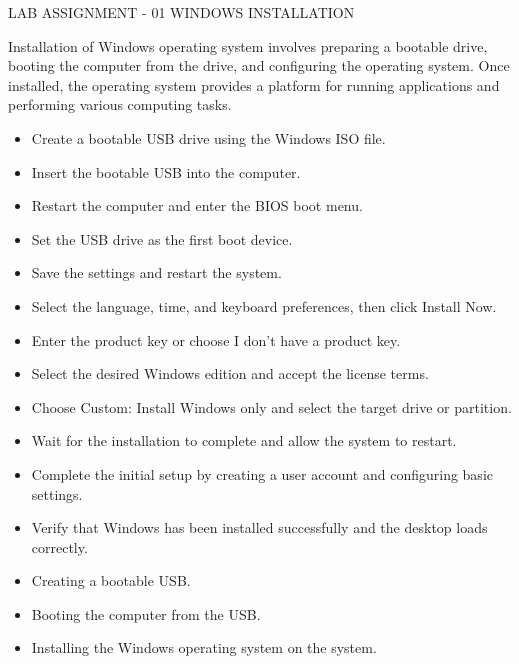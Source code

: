 
\assignmenttitle
    {LAB ASSIGNMENT - 01}
    {WINDOWS INSTALLATION}


Installation of Windows operating system involves preparing a bootable drive, booting the computer from the drive, and configuring the operating system. Once installed, the operating system provides a platform for running applications and performing various computing tasks.


\begin{itemize}
    \item Create a bootable USB drive using the Windows ISO file.
    \item Insert the bootable USB into the computer.
    \item Restart the computer and enter the BIOS boot menu.
    \item Set the USB drive as the first boot device.
    \item Save the settings and restart the system.
    \item Select the language, time, and keyboard preferences, then click Install Now.
    \item Enter the product key or choose I don't have a product key.
    \item Select the desired Windows edition and accept the license terms.
    \item Choose Custom: Install Windows only and select the target drive or partition.
    \item Wait for the installation to complete and allow the system to restart.
    \item Complete the initial setup by creating a user account and configuring basic settings.
    \item Verify that Windows has been installed successfully and the desktop loads correctly.
\end{itemize}

\begin{itemize}
\item{Creating a bootable USB.}
\item{Booting the computer from the USB.}
\item{Installing the Windows operating system on the system.}
\end{itemize}


